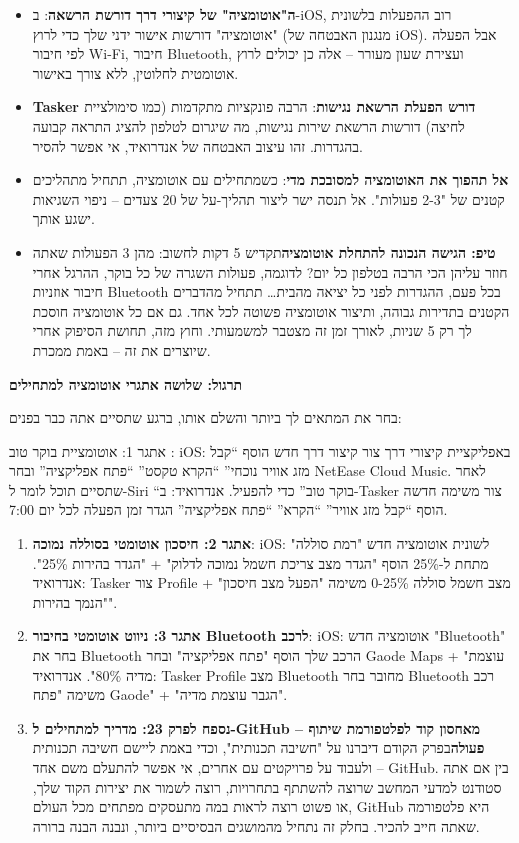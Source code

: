 \begin{itemize}
  \item \textbf{ה"אוטומציה" של קיצורי דרך דורשת הרשאה}: ב-iOS, רוב ההפעלות בלשונית "אוטומציה" דורשות אישור ידני שלך כדי לרוץ (מנגנון האבטחה של iOS). אבל הפעלה לפי חיבור Wi-Fi, חיבור Bluetooth, ועצירת שעון מעורר – אלה כן יכולים לרוץ אוטומטית לחלוטין, ללא צורך באישור.
  \item \textbf{Tasker דורש הפעלת הרשאת נגישות}: הרבה פונקציות מתקדמות (כמו סימולציית לחיצה) דורשות הרשאת שירות נגישות, מה שיגרום לטלפון להציג התראה קבועה בהגדרות. זהו עיצוב האבטחה של אנדרואיד, אי אפשר להסיר.
  \item \textbf{אל תהפוך את האוטומציה למסובכת מדי}: כשמתחילים עם אוטומציה, תתחיל מתהליכים קטנים של "2-3 פעולות". אל תנסה ישר ליצור תהליך-על של 20 צעדים – ניפוי השגיאות ישגע אותך.
  \item \textbf{טיפ: הגישה הנכונה להתחלת אוטומציה}תקדיש 5 דקות לחשוב: מהן 3 הפעולות שאתה חוזר עליהן הכי הרבה בטלפון כל יום? לדוגמה, פעולות השגרה של כל בוקר, ההרגל אחרי חיבור אוזניות Bluetooth בכל פעם, ההגדרות לפני כל יציאה מהבית… תתחיל מהדברים הקטנים בתדירות גבוהה, ותיצור אוטומציה פשוטה לכל אחד. גם אם כל אוטומציה חוסכת לך רק 5 שניות, לאורך זמן זה מצטבר למשמעותי. וחוץ מזה, תחושת הסיפוק אחרי שיוצרים את זה – באמת ממכרת.
\end{itemize}

\textbf{תרגול: שלושה אתגרי אוטומציה למתחילים}\par

בחר את המתאים לך ביותר והשלם אותו, ברגע שתסיים אתה כבר בפנים:

\begin{tcbpractice}{אתגר 1: אוטומציית בוקר טוב}
: iOS: באפליקציית קיצורי דרך צור קיצור דרך חדש הוסף “קבל מזג אוויר נוכחי” “הקרא טקסט” “פתח אפליקציה” ובחר NetEase Cloud Music. לאחר שתסיים תוכל לומר ל-Siri “בוקר טוב” כדי להפעיל. אנדרואיד: ב-Tasker צור משימה חדשה הוסף “קבל מזג אוויר” “הקרא” “פתח אפליקציה” הגדר זמן הפעלה לכל יום 7:00.

\begin{enumerate}
  \item \textbf{אתגר 2: חיסכון אוטומטי בסוללה נמוכה}: iOS: לשונית אוטומציה חדש "רמת סוללה" מתחת ל-25\% הוסף "הגדר מצב צריכת חשמל נמוכה לדלוק" + "הגדר בהירות 25\%". אנדרואיד: Tasker צור Profile מצב חשמל סוללה 0-25\% משימה "הפעל מצב חיסכון" + "הנמך בהירות".
  \item \textbf{אתגר 3: ניווט אוטומטי בחיבור Bluetooth לרכב}: iOS: אוטומציה חדש "Bluetooth" בחר את Bluetooth הרכב שלך הוסף "פתח אפליקציה" ובחר Gaode Maps + "עוצמת מדיה 80\%". אנדרואיד: Tasker Profile מצב Bluetooth מחובר בחר Bluetooth רכב משימה "פתח Gaode" + "הגבר עוצמת מדיה".
  \item \textbf{נספח לפרק 23: מדריך למתחילים ל-GitHub – מאחסון קוד לפלטפורמת שיתוף פעולה}בפרק הקודם דיברנו על "חשיבה תכנותית", וכדי באמת ליישם חשיבה תכנותית ולעבוד על פרויקטים עם אחרים, אי אפשר להתעלם משם אחד – GitHub. בין אם אתה סטודנט למדעי המחשב שרוצה להשתתף בתחרויות, רוצה לשמור את יצירות הקוד שלך, או פשוט רוצה לראות במה מתעסקים מפתחים מכל העולם, GitHub היא פלטפורמה שאתה חייב להכיר. בחלק זה נתחיל מהמושגים הבסיסיים ביותר, ונבנה הבנה ברורה.
\end{enumerate}

\end{tcbpractice}


